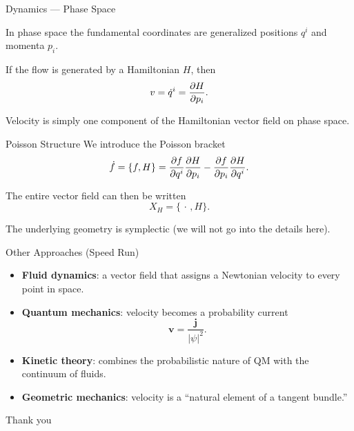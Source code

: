 \documentclass[aspectratio=169,11pt]{beamer}
\begin{document}
\begin{frame}{Dynamics --- Phase Space}

In phase space the fundamental coordinates are generalized positions $q^{i}$ and momenta $p_{i}$.

If the flow is generated by a Hamiltonian $H$, then
\[
v = \dot{q}^{i} = \pdv{H}{p_{i}}.
\]

Velocity is simply one component of the Hamiltonian vector field on phase space.
\end{frame}

\begin{frame}{Poisson Structure}
We introduce the Poisson bracket
\[
\dot{f} = \{f,H\}
= \pdv{f}{q^{i}}\pdv{H}{p_{i}} - \pdv{f}{p_{i}}\pdv{H}{q^{i}}.
\]

The entire vector field can then be written
\[
X_{H} = \{\,\cdot\,,H\}.
\]

The underlying geometry is symplectic (we will not go into the details here).
\end{frame}

\begin{frame}{Other Approaches (Speed Run)}
\begin{itemize}
  \item \textbf{Fluid dynamics}: a vector field that assigns a Newtonian velocity to every point in space.
  \item \textbf{Quantum mechanics}: velocity becomes a probability current
  \[
  \mathbf{v} = \frac{\mathbf{j}}{|\psi|^{2}}.
  \]
  \item \textbf{Kinetic theory}: combines the probabilistic nature of QM with the continuum of fluids.
  \item \textbf{Geometric mechanics}: velocity is a ``natural element of a tangent bundle.''
\end{itemize}
\end{frame}


\begin{frame}
\begin{center}
\Huge Thank you
\end{center}
\end{frame}
\end{document}
